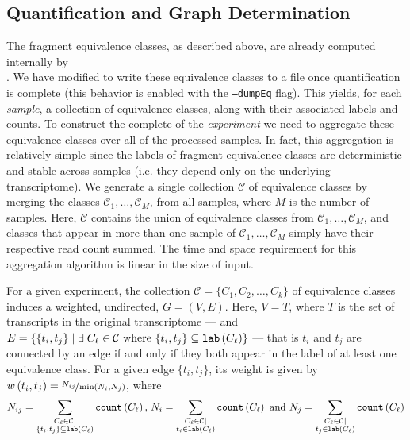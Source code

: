 \subsection{Quantification and Graph Determination}
\label{subsec:ambig_graph}

The fragment equivalence classes, as described above, are already computed internally by \\ \sailfish \citep{sailfish}. We have modified \sailfish to write these equivalence classes to a file once quantification is complete (this behavior is enabled with the \texttt{--dumpEq} flag).  This yields, for each \textit{sample}, a collection of equivalence classes, along with their associated labels and counts. To construct the complete \ambiggraph of the \textit{experiment} we need to aggregate these equivalence classes over all of the processed samples. In fact, this aggregation is relatively simple since the labels of fragment equivalence classes are deterministic and stable across samples (i.e. they depend only on the underlying transcriptome). We generate a single collection $\mathcal{C}$ of equivalence classes by merging the classes $\mathcal{C}_1, \dots, \mathcal{C}_M$, from all samples, where $M$ is the number of samples. Here, $\mathcal{C}$ contains the union of equivalence classes from $\mathcal{C}_1, \dots, \mathcal{C}_M$, and classes that appear in more than one sample of $\mathcal{C}_1, \dots, \mathcal{C}_M$ simply have their respective read count summed.  The time and space requirement for this aggregation algorithm is linear in the size of input.

For a given experiment, the collection $\mathcal{C} = \{C_1,C_2,\ldots,C_k\}$ of equivalence classes induces a weighted, undirected, \ambiggraph $G = \left(V, E\right)$.  Here, $V = T$, where $T$ is the set of transcripts in the original transcriptome --- and $E = \{ \{t_i, t_j\} \mid \exists\; C_\ell \in \mathcal{C} \text{ where } \{t_i, t_j\} \subseteq \text{\texttt{lab}}\left(C_\ell\right)\}$ --- that is $t_i$ and $t_j$ are connected by an edge if and only if they both appear in the label of at least one equivalence class.  For a given edge $\{t_i, t_j\}$, its weight is given by $w\left(t_i, t_j\right) = \nicefrac{N_{ij}}{\min\left(N_i, N_j\right)}$, where
    \[
    N_{ij} = 
    \sum_{\substack{C_\ell \in \mathcal{C} \mid \\ \{t_i, t_j\} \subseteq \text{\texttt{lab}}\left(C_\ell\right)}} \text{\texttt{count}}\left(C_\ell\right)
        ,\, N_i = \sum_{\substack{C_\ell \in \mathcal{C} \mid \\ t_i \in \text{\texttt{lab}}\left(C_\ell\right)}} \text{\texttt{count}}\left(C_\ell\right) \text{ and }
    N_j = \sum_{\substack{C_\ell \in \mathcal{C} \mid \\ t_j \in \text{\texttt{lab}}\left(C_\ell\right)}} \text{\texttt{count}}\left(C_\ell\right)
    \]

